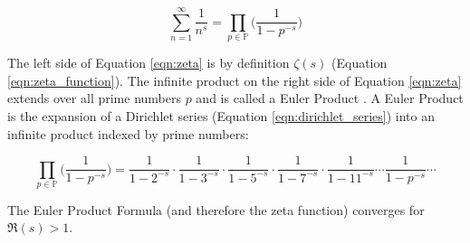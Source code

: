 \documentclass[11pt, oneside]{article}   	%
\theoremstyle{definition}
\begin{document}
\medskip
\begin{equation}
\sum^\infty_{n = 1} \frac{1}{n^s} = \prod_{p \in \mathbb{P}}  \bigg (\frac{1}{1 - p^{-s}} \bigg )
\label{eqn:zeta}
\end{equation}

\bigskip
\noindent
The left side of Equation \ref{eqn:zeta} is by definition $\zeta(s)$ (Equation \ref{eqn:zeta_function}). The infinite product on the right side of Equation \ref{eqn:zeta}  
extends over all prime numbers $p$ and is called a Euler Product \cite{euler_product}. A Euler Product is the expansion of a Dirichlet series 
(Equation \ref{eqn:dirichlet_series}) into an infinite product indexed by prime numbers:

\begin{equation*}
\prod_{p \in \mathbb{P}}  \bigg (\frac{1}{1 - p^{-s}} \bigg ) = \frac{1}{1 - 2^{-s}} \cdot \frac{1}{1 - 3^{-s}} \cdot  \frac{1}{1 - 5^{-s}} \cdot  \frac{1}{1 - 7^{-s}} \cdot  \frac{1}{1 - 11^{-s}} \cdots  \frac{1}{1 - p^{-s}} \cdots
\end{equation*}

\bigskip
\noindent
The Euler Product Formula (and therefore the zeta function) converges for $\Re(s) > 1$.

\newpage


\end{document}
